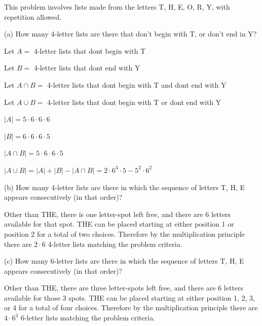 \documentclass[openany, 12pt]{book}
\begin{document}
\begin{exercise}{}{}
	This problem involves lists made from the letters T, H, E, O, R, Y, with repetition allowed.
	\begin{alist}
		\item (a) How many 4-letter lists are there that don't begin with T, or don't
		end in Y?
		\item Let $A=$ 4-letter lists that dont begin with T
		\item Let $B=$ 4-letter lists that dont end with Y
		\item Let $A\cap B=$ 4-letter lists that dont begin with T and dont end with Y
		\item Let $A\cup B=$ 4-letter lists that dont begin with T or dont end with Y
		\item $|A|= 5\cdot6\cdot6\cdot6$
		\item $|B|= 6\cdot6\cdot6\cdot5$
		\item $|A\cap B|= 5\cdot6\cdot6\cdot5$
		\item $|A\cup B|= |A| + |B| - |A\cap B| = 2\cdot 6^3\cdot5 - 5^2\cdot6^2$
		\item (b) How many 4-letter lists are there in which the sequence of letters T,
		H, E appears consecutively (in that order)?
		\item Other than THE, there is one letter-spot left free, and there are 6 letters
		available for that spot. THE can be placed starting at either position 1 or
		position 2 for a total of two choices. Therefore by the multiplication
		principle there are $2\cdot6$ 4-letter lists matching the problem criteria.
		\item (c) How many 6-letter lists are there in which the sequence of letters T,
		H, E appears consecutively (in that order)?
		\item Other than THE, there are three letter-spots left free, and there are 6 letters
		available for those 3 spots. THE can be placed starting at either position
		1, 2, 3, or 4 for a total of four choices. Therefore by the multiplication
		principle there are $4\cdot6^3$ 6-letter lists matching the problem criteria.
	\end{alist}
\end{exercise}
\end{document}

